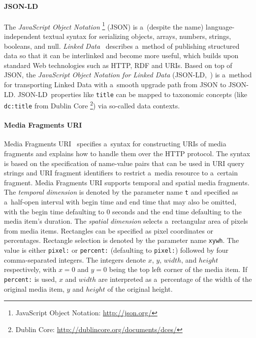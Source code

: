 \documentclass{sig-alternate}
\newcommand{\inlinelistingsize}{\fontsize{8pt}{11pt}}
\let\oldurl\url
\renewcommand{\url}[1]{\inlinelistingsize\oldurl{#1}}
\def\JSONLD{\mbox{JSON-LD}}
\begin{document}
\paragraph{\JSONLD}

The \emph{JavaScript Object Notation}%
\footnote{JavaScript Object Notation: \url{http://json.org/}}
(JSON)
is a~(despite the name) language-independent textual syntax
for serializing objects, arrays, numbers, strings, booleans, and null.
\emph{Linked Data}~\cite{bizer2009linkeddata}
describes a~method of publishing structured data
so that it can be interlinked and become more useful,
which builds upon standard Web technologies such as HTTP, RDF and URIs.
Based on top of JSON, the
\emph{JavaScript Object Notation for Linked Data}
(\JSONLD,~\cite{sporny2013jsonld}) is a~method for transporting
Linked Data with a~smooth upgrade path from JSON to \JSONLD.
\JSONLD\ properties like \texttt{title} can be mapped to taxonomic
concepts (like \texttt{dc:title} from Dublin Core%
\footnote{Dublin Core: \url{http://dublincore.org/documents/dces/}})
via so-called data contexts.

\paragraph{Media Fragments URI}

Media Fragments URI~\cite{troncy2012mediafragments}
specifies a~syntax for constructing URIs of media fragments
and explains how to handle them over the HTTP protocol.
The syntax is based on the specification of
name-value pairs that can be used in URI query strings
and URI fragment identifiers to restrict a~media resource
to a~certain fragment.
Media Fragments URI supports temporal and spatial media fragments.
The \emph{temporal dimension} is denoted
by the parameter name \texttt{t} and specified
as a~half-open interval with begin time and end time
that may also be omitted,
with the begin time defaulting to 0 seconds
and the end time defaulting to the media item's duration.
The \emph{spatial dimension} selects
a~rectangular area of pixels from media items.
Rectangles can be specified as pixel coordinates or percentages.
Rectangle selection is denoted by the parameter name \texttt{xywh}.
The value is either \texttt{pixel:} or \texttt{percent:}
(defaulting to \texttt{pixel:})
followed by four comma-separated integers.
The integers denote $x$, $y$, $width$, and $height$ respectively,
with $x = 0$ and $y = 0$ being the top left corner of the media item.
If \texttt{percent:} is used, $x$ and $width$ are interpreted
as a~percentage of the width of the original media item,
$y$ and $height$
of the original height.
\end{document}
